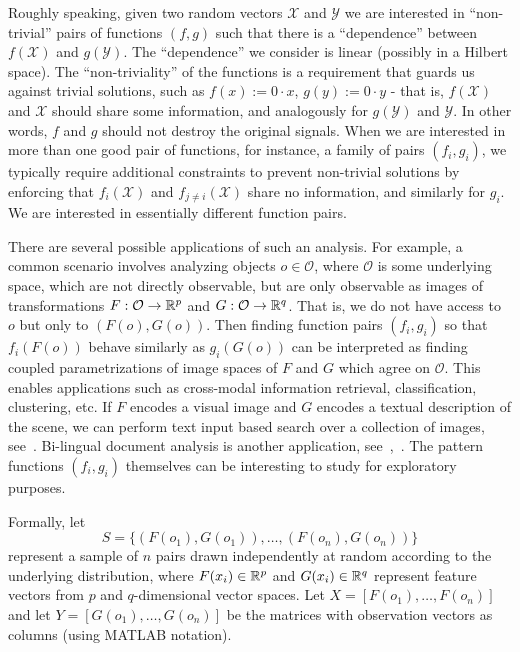 Roughly speaking, given two random vectors $\mathcal{X}$ and $\mathcal{Y}$ we are interested in ``non-trivial'' pairs of functions $(f,g)$ such that there is a ``dependence'' between $f(\mathcal{X})$ and $g(\mathcal{Y})$. The ``dependence'' we consider is linear (possibly in a Hilbert space). The ``non-triviality'' of the functions is a requirement that guards us against trivial solutions, such as $f(x) := 0 \cdot x$, $g(y) := 0 \cdot y$ - that is, $f(\mathcal{X})$ and $\mathcal{X}$ should share some information, and analogously for $g(\mathcal{Y})$ and $\mathcal{Y}$. In other words, $f$ and $g$ should not destroy the original signals. When we are interested in more than one good pair of functions, for instance, a family of pairs $(f_i,g_i)$, we typically require additional constraints to prevent non-trivial solutions by enforcing that $f_i\left(\mathcal{X}\right)$ and $f_{j \neq i}\left(\mathcal{X}\right)$ share no information, and similarly for $g_i$. We are interested in essentially different function pairs.

There are several possible applications of such an analysis. For example, a common scenario involves analyzing objects $o \in \mathcal{O}$, where $\mathcal{O}$ is some underlying space, which are not directly observable, but are only observable as images of transformations $F: \mathcal{O} \rightarrow \mathbb{R}^p$ and $G: \mathcal{O} \rightarrow \mathbb{R}^q$. That is, we do not have access to $o$ but only to $\left(F(o), G(o)\right)$. Then finding function pairs $(f_i, g_i)$ so that $f_i(F(o))$ behave similarly as $g_i(G(o))$ can be interpreted as finding coupled parametrizations of image spaces of $F$ and $G$ which agree on $\mathcal{O}$. This enables applications such as cross-modal information retrieval, classification, clustering, etc. If $F$ encodes a visual image and $G$ encodes a textual description of the scene, we can perform text input based search over a collection of images, see~\cite{HardoonCCA}. Bi-lingual document analysis is another application, see~\cite{vinokourov2002inferring},~\cite{mrpqr}. The pattern functions $(f_i, g_i)$ themselves can be interesting to study for exploratory purposes.

Formally, let
$$ S = \{ \left( F(o_1), G(o_1) \right), \ldots, \left( F(o_n), G(o_n) \right) \} $$
represent a sample of $n$ pairs drawn independently at random according to the underlying distribution,
where $F(x_i) \in \mathbb{R}^p$ and $G(x_i) \in \mathbb{R}^q$ represent feature vectors from $p$ and $q$-dimensional
vector spaces. Let $X=[F(o_1), \ldots, F(o_n)]$ and let $Y=[G(o_1), \ldots ,G(o_n)]$ be the matrices
with observation vectors as columns (using MATLAB notation).

